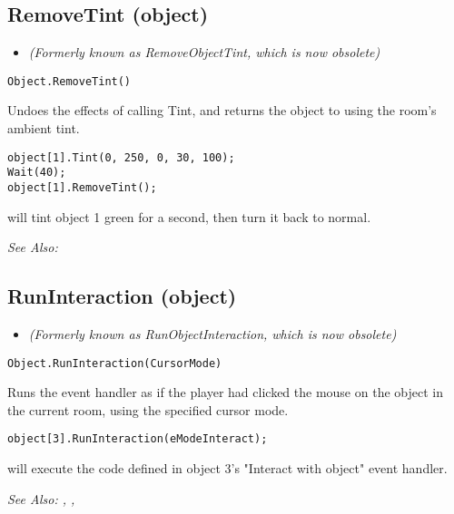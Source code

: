\subsection{RemoveTint (object)}\label{Object.RemoveTint}%

\begin{itemize}
\item \it{(Formerly known as RemoveObjectTint, which is now obsolete)}
\end{itemize}

\begin{verbatim}
Object.RemoveTint()
\end{verbatim}

Undoes the effects of calling Tint, and returns the object to using the room's ambient tint.

\begin{verbatim}
object[1].Tint(0, 250, 0, 30, 100);
Wait(40);
object[1].RemoveTint();
\end{verbatim}
will tint object 1 green for a second, then turn it back to normal.

\it{See Also:} 


\subsection{RunInteraction (object)}\label{Object.RunInteraction}%

\begin{itemize}
\item \it{(Formerly known as RunObjectInteraction, which is now obsolete)}
\end{itemize}

\begin{verbatim}
Object.RunInteraction(CursorMode)
\end{verbatim}
Runs the event handler as if the player had clicked the mouse
on the object in the current room, using the specified cursor mode.

\begin{verbatim}
object[3].RunInteraction(eModeInteract);
\end{verbatim}
will execute the code defined in object 3's "Interact with object" event handler.

\it{See Also:} ,
,



